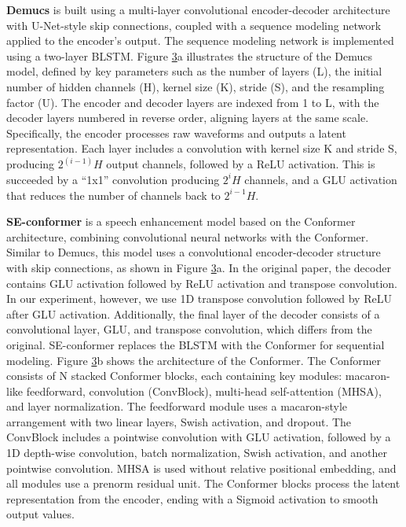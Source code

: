\documentclass[10pt]{wlscirep}
\begin{document}
\textbf{Demucs} is built using a multi-layer convolutional encoder-decoder architecture with U-Net-style skip connections, coupled with a sequence modeling network applied to the encoder's output. The sequence modeling network is implemented using a two-layer BLSTM. Figure \hyperref[fig:3]{3}a illustrates the structure of the Demucs model, defined by key parameters such as the number of layers (L), the initial number of hidden channels (H), kernel size (K), stride (S), and the resampling factor (U). The encoder and decoder layers are indexed from 1 to L, with the decoder layers numbered in reverse order, aligning layers at the same scale. Specifically, the encoder processes raw waveforms and outputs a latent representation. Each layer includes a convolution with kernel size K and stride S, producing $2^{(i-1)}H$ output channels, followed by a ReLU activation. This is succeeded by a ``1x1'' convolution producing $2^iH$ channels, and a GLU activation that reduces the number of channels back to $2^{i-1}H$.

\textbf{SE-conformer} is a speech enhancement model based on the Conformer architecture, combining convolutional neural networks with the Conformer. Similar to Demucs, this model uses a convolutional encoder-decoder structure with skip connections, as shown in Figure \hyperref[fig:3]{3}a. In the original paper, the decoder contains GLU activation followed by ReLU activation and transpose convolution. In our experiment, however, we use 1D transpose convolution followed by ReLU after GLU activation. Additionally, the final layer of the decoder consists of a convolutional layer, GLU, and transpose convolution, which differs from the original. SE-conformer replaces the BLSTM with the Conformer for sequential modeling. Figure \hyperref[fig:3]{3}b shows the architecture of the Conformer. The Conformer consists of N stacked Conformer blocks, each containing key modules: macaron-like feedforward, convolution (ConvBlock), multi-head self-attention (MHSA), and layer normalization. The feedforward module uses a macaron-style arrangement with two linear layers, Swish activation, and dropout. The ConvBlock includes a pointwise convolution with GLU activation, followed by a 1D depth-wise convolution, batch normalization, Swish activation, and another pointwise convolution. MHSA is used without relative positional embedding, and all modules use a prenorm residual unit. The Conformer blocks process the latent representation from the encoder, ending with a Sigmoid activation to smooth output values.
\end{document}
